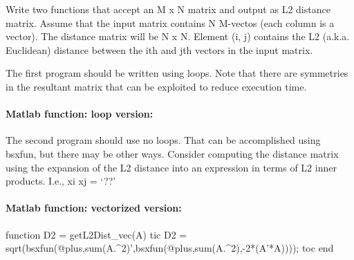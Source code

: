 \documentclass[11pt]{article}
\newenvironment{Shaded}{}{}
\newcommand{\FloatTok}[1]{\textcolor[rgb]{0.25,0.63,0.44}{{#1}}}
\newcommand{\StringTok}[1]{\textcolor[rgb]{0.25,0.44,0.63}{{#1}}}
\newcommand{\NormalTok}[1]{{#1}}
\begin{document}
Write two functions that accept an M x N matrix and output as L2
distance matrix. Assume that the input matrix contains N M-vectos (each
column is a vector). The distance matrix will be N x N. Element (i, j)
contains the L2 (a.k.a. Euclidean) distance between the ith and jth
vectors in the input matrix.

The first program should be written using loops. Note that there are
symmetries in the resultant matrix that can be exploited to reduce
execution time.

\hypertarget{matlab-function-loop-version}{%
\paragraph{Matlab function: loop
version:}\label{matlab-function-loop-version}}

\begin{Shaded}
\end{Shaded}

The second program should use no loops. That can be accomplished using
bsxfun, but there may be other ways. Consider computing the distance
matrix using the expansion of the L2 distance into an expression in
terms of L2 inner products. I.e., \textbar{}\textbar{}xi
x\textbar{}j\textbar{}\textbar{} = `??'

\hypertarget{matlab-function-vectorized-version}{%
\paragraph{Matlab function: vectorized
version:}\label{matlab-function-vectorized-version}}

\begin{Shaded}
\begin{Highlighting}[]
\NormalTok{function D2 = getL2Dist_vec(A)}
\NormalTok{    tic}
\NormalTok{    D2 = sqrt(bsxfun(@plus,sum(A.^}\FloatTok{2}\NormalTok{)',bsxfun(@plus,sum(A.^}\FloatTok{2}\NormalTok{),-}\FloatTok{2}\NormalTok{*(A'*A))));}
\NormalTok{    toc}
\NormalTok{end}
\end{Highlighting}
\end{Shaded}
\end{document}
